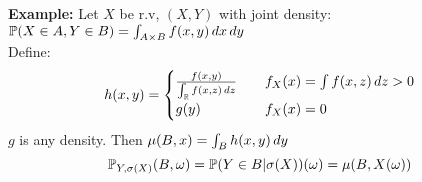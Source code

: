 \textbf{Example:} Let $X$ be r.v, $(X,Y)$ with joint density: $\mathbb{P}(X\in A, Y\in B) =\int_{A\times B} f(x,y) \mathop{}\!d x\mathop{}\!d y$ \\Define:
\begin{equation*}
    h(x,y) = \begin{cases}
    \frac{f(x,y)}{\int_{\mathbb{R}} f(x,z) \mathop{}\!d z} \quad &f_X(x) = \int f(x,z)\mathop{}\!d z >0 \\
    g(y) \quad &f_X(x) = 0
    \end{cases}
\end{equation*}
$g$ is any density. Then $\mu(B,x)= \int_B h(x,y) \mathop{}\!d y$ 
\begin{equation*}
    \mathbb{P}_{Y,\sigma(X)} (B,\omega) = \mathbb{P}(Y\in B|\sigma(X))(\omega) = \mu(B, X(\omega))
\end{equation*}